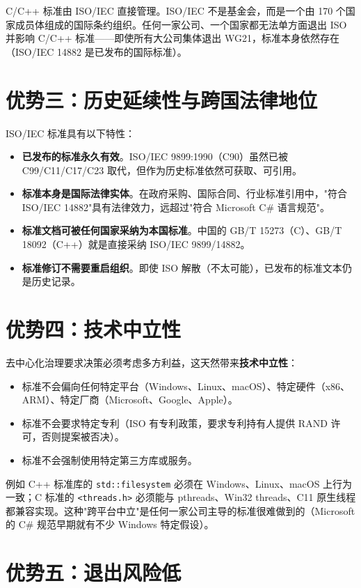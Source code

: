 \documentclass[12pt,a4paper,fontset=fandol]{ctexbook}
\newcommand{\kw}[1]{\texttt{#1}}
\begin{document}
C/C++ 标准由 ISO/IEC 直接管理。ISO/IEC 不是基金会，而是一个由 170 个国家成员体组成的国际条约组织。任何一家公司、一个国家都无法单方面退出 ISO 并影响 C/C++ 标准——即使所有大公司集体退出 WG21，标准本身依然存在（ISO/IEC 14882 是已发布的国际标准）。

\section{优势三：历史延续性与跨国法律地位}

ISO/IEC 标准具有以下特性：

\begin{itemize}
  \item \textbf{已发布的标准永久有效}。ISO/IEC 9899:1990（C90）虽然已被 C99/C11/C17/C23 取代，但作为历史标准依然可获取、可引用。
  \item \textbf{标准本身是国际法律实体}。在政府采购、国际合同、行业标准引用中，"符合 ISO/IEC 14882"具有法律效力，远超过"符合 Microsoft C\# 语言规范"。
  \item \textbf{标准文档可被任何国家采纳为本国标准}。中国的 GB/T 15273（C）、GB/T 18092（C++）就是直接采纳 ISO/IEC 9899/14882。
  \item \textbf{标准修订不需要重启组织}。即使 ISO 解散（不太可能），已发布的标准文本仍是历史记录。
\end{itemize}

\section{优势四：技术中立性}

去中心化治理要求决策必须考虑多方利益，这天然带来\textbf{技术中立性}：

\begin{itemize}
  \item 标准不会偏向任何特定平台（Windows、Linux、macOS）、特定硬件（x86、ARM）、特定厂商（Microsoft、Google、Apple）。
  \item 标准不会要求特定专利（ISO 有专利政策，要求专利持有人提供 RAND 许可，否则提案被否决）。
  \item 标准不会强制使用特定第三方库或服务。
\end{itemize}

例如 C++ 标准库的 \kw{std::filesystem} 必须在 Windows、Linux、macOS 上行为一致；C 标准的 \kw{<threads.h>} 必须能与 pthreads、Win32 threads、C11 原生线程都兼容实现。这种"跨平台中立"是任何一家公司主导的标准很难做到的（Microsoft 的 C\# 规范早期就有不少 Windows 特定假设）。

\section{优势五：退出风险低}
\end{document}
